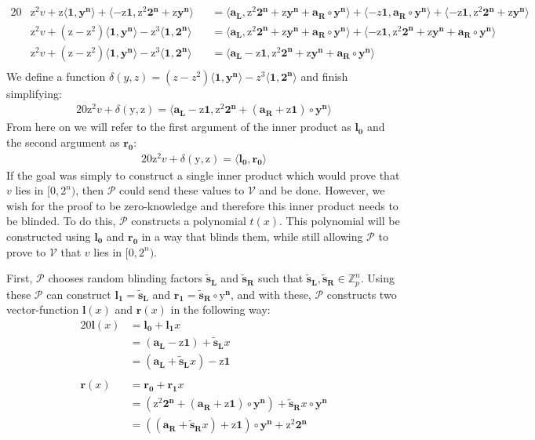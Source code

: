 \documentclass{article}
\newcommand{\eq}[1]{\begin{alignat*}{20}#1\end{alignat*}}
\renewcommand{\vec}[1]{\boldsymbol{#1}}
\newcommand{\ran}[1]{\mathrm{#1}}
\newcommand{\vecran}[1]{\mathbf{#1}}
\newcommand{\V}{\mathcal{V}}
\renewcommand{\P}{\mathcal{P}}
\newcommand{\Z}{\mathbb{Z}}
\newcommand{\dotp}[2]{\langle #1, #2 \rangle}
\newcommand{\opn}[1]{\operatorname{#1}}
\newcommand{\vecl}[1]{\vec{#1_{\opn{L}}}}
\newcommand{\vecr}[1]{\vec{#1_{\opn{R}}}}
\newcommand{\blind}[1]{\widetilde{#1}}
\newcommand{\bs}{\blind{s}}
\begin{document}
\eq{
	&\ran{z^2}v + \ran{z}\dotp{\vec{1}}{\vecran{y}^{\vec{n}}} + \dotp{-\ran{z}\vec{1}}{\ran{z^2}\vec{2^n} + \ran{z}\vecran{y}^{\vec{n}}}
	&&= \dotp{\vecl{a}}{\ran{z^2}\vec{2^n} + \ran{z}\vecran{y}^{\vec{n}} + \vecr{a}\circ \vecran{y}^{\vec{n}}} +
	\dotp{-z\vec{1}}{\vecr{a}\circ\vecran{y}^{\vec{n}}} + \dotp{-\ran{z}\vec{1}}{\ran{z^2}\vec{2^n} + \ran{z}\vecran{y}^{\vec{n}}} \\ 
	&\ran{z^2}v + (\ran{z} - \ran{z^2})\dotp{\vec{1}}{\vecran{y}^{\vec{n}}} - \ran{z^3}\dotp{\vec{1}}{\vec{2^n}} &&= \dotp{\vecl{a}}{\ran{z^2}\vec{2^n} + \ran{z}\vecran{y}^{\vec{n}} + \vecr{a}\circ \vecran{y}^{\vec{n}}} + \dotp{-\ran{z}\vec{1}}{\ran{z^2}\vec{2^n}+\ran{z}\vecran{y}^{\vec{n}} + \vecr{a}\circ\vecran{y}^{\vec{n}}}
	\\
	&\ran{z^2}v + (\ran{z} - \ran{z^2})\dotp{\vec{1}}{\vecran{y}^{\vec{n}}} - \ran{z^3}\dotp{\vec{1}}{\vec{2^n}} &&= \dotp{\vecl{a}- \ran{z}\vec{1}}{\ran{z^2}\vec{2^n} + \ran{z}\vecran{y}^{\vec{n}} + \vecr{a}\circ \vecran{y}^{\vec{n}}} \\
}
We define a function $\delta(y,z) = (z - z^2)\dotp{\vec{1}}{\vec{y^n}}
- z^3\dotp{\vec{1}}{\vec{2^n}}$ and finish simplifying:
\eq{
	\ran{z^2}v + \delta(\ran{y},\ran{z}) = \dotp{\vecl{a} - \ran{z}\vec{1}}{\ran{z^2}\vec{2^n} + (\vecr{a} + \ran{z}\vec{1})\circ\vecran{y}^{\vec{n}}}
}
From here on we will refer to the first argument of the inner product
as $\vec{l_0}$ and the second argument as $\vec{r_0}$:
\eq{
	\ran{z^2}v + \delta(\ran{y},\ran{z}) = \dotp{\vec{l_0}}{\vec{r_0}}
}
If the goal was simply to construct a single inner product which
would prove that $v$ lies in $[0,2^n)$, then $\P$ could send
these values to $\V$ and be done. However, we wish for the proof to be
zero-knowledge and therefore this inner product needs to be blinded. To
do this, $\P$ constructs a polynomial $t(x)$. This polynomial will
be constructed using $\vec{l_0}$ and $\vec{r_0}$ in a way that blinds
them, while still allowing $\P$ to prove to $\V$ that $v$ lies in
$[0,2^n)$.

First, $\P$ chooses random blinding factors $\vecl{\blind{s}}$ and
$\vecr{\bs}$ such that $\vecl{\bs},\vecr{\bs}\in \Z^n_p$. Using
these $\P$ can construct $\vec{l_1} = \vecl{\bs}$ and $\vec{r_1} =
\vecr{\bs}\circ \vec{\ran{y}^n}$, and with these, $\P$ constructs two
vector-function $\vec{l}(x)$ and $\vec{r}(x)$ in the following way:
\eq{
	\vec{l}(x) &= \vec{l_0} + \vec{l_1}x \\ 
	&= (\vecl{a} - \ran{z}\vec{1}) + \vecl{\bs}x \\ 
	&= (\vecl{a} + \vecl{\bs}x) - \ran{z}\vec{1}\\&\\
	\vec{r}(x) &= \vec{r_0} + \vec{r_1}x \\ 
	&= (\ran{z^2}\vec{2^n} + (\vecr{a} + \ran{z}\vec{1})\circ\vecran{y}^{\vec{n}}) + \vecr{\bs}x\circ\vecran{y}^{\vec{n}} \\ 
	&= ((\vecr{a} + \vecr{\bs}x) + \ran{z}\vec{1}) \circ \vecran{y}^{\vec{n}} + \ran{z}^2\vec{2^n}
}
\end{document}
